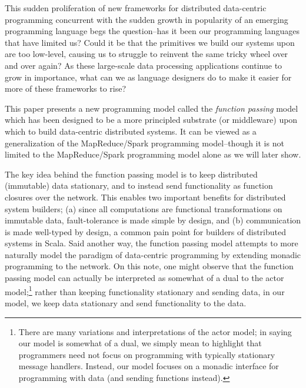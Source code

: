 \documentclass{jfp1}
\begin{document}

This sudden proliferation of new frameworks for distributed data-centric
programming concurrent with the sudden growth in popularity of an emerging
programming language begs the question--has it been our programming languages
that have limited us? Could it be that the primitives we build our systems upon
are too low-level, causing us to struggle to reinvent the same tricky wheel over
and over again? As these large-scale data processing applications continue to
grow in importance, what can we as language designers do to make it easier for
more of these frameworks to rise?

This paper presents a new programming model called the {\em function passing}
model which has been designed to be a more principled substrate (or middleware)
upon which to build data-centric distributed systems. It can be viewed as a
generalization of the MapReduce/Spark programming model--though it is not
limited to the MapReduce/Spark programming model alone as we will later show.

The key idea behind the function passing model is to keep distributed
(immutable) data stationary, and to instead send functionality as function
closures over the network. This enables two important benefits for distributed
system builders; (a) since all computations are functional transformations on
immutable data, fault-tolerance is made simple by design, and (b) communication
is made well-typed by design, a common pain point for builders of distributed
systems in Scala. Said another way, the function passing model attempts to more
naturally model the paradigm of data-centric programming by extending monadic
programming to the network.
On this note, one might observe that the function passing model can actually be
interpreted as somewhat of a dual to the actor model;\footnote{There are many
variations and interpretations of the actor model; in saying our model is
somewhat of a dual, we simply mean to highlight that programmers need not focus
on programming with typically stationary message handlers. Instead, our model
focuses on a monadic interface for programming with data (and sending functions
instead).} rather than keeping functionality stationary and sending data, in our
model, we keep data stationary and send functionality to the data.
\end{document}
